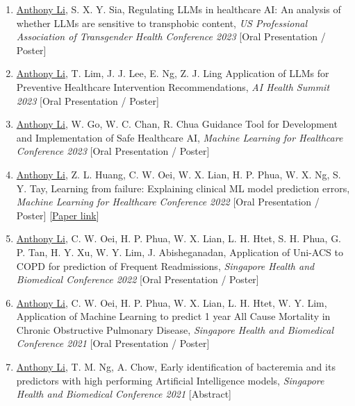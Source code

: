 \documentclass[letterpaper,10pt,oneside]{article}
\begin{document}
\begin{body}
\begin{enumerate}
\item \underline{Anthony Li}, S. X. Y. Sia, \textcolor{mygray}{Regulating LLMs in healthcare AI: An analysis of whether LLMs are sensitive to transphobic content}, \textit{US Professional Association of Transgender Health Conference 2023} [Oral Presentation / Poster]

\item \underline{Anthony Li}, T. Lim, J. J. Lee, E. Ng, Z. J. Ling \textcolor{mygray}{Application of LLMs for Preventive Healthcare Intervention Recommendations}, \textit{AI Health Summit 2023} [Oral Presentation / Poster]

\item \underline{Anthony Li}, W. Go, W. C. Chan, R. Chua \textcolor{mygray}{Guidance Tool for Development and Implementation of Safe Healthcare AI}, \textit{Machine Learning for Healthcare Conference 2023} [Oral Presentation / Poster]

\item \underline{Anthony Li}, Z. L. Huang, C. W. Oei, W. X. Lian, H. P. Phua, W. X. Ng, S. Y. Tay, \textcolor{mygray}{Learning from failure: Explaining clinical ML model prediction errors}, \textit{Machine Learning for Healthcare Conference 2022} [Oral Presentation / Poster]
[\href{https://static1.squarespace.com/static/59d5ac1780bd5ef9c396eda6/t/62e97c1b5754a426fa21d3bf/1659468827549/16+MLHC_Explaining_ML_model_failures_v4.pdf}{Paper link}]

\item \underline{Anthony Li}, C. W. Oei, H. P. Phua, W. X. Lian, L. H. Htet, S. H. Phua, G. P. Tan, H. Y. Xu, W. Y. Lim, J. Abisheganadan, \textcolor{mygray}{Application of Uni-ACS to COPD for prediction of Frequent Readmissions}, \textit{Singapore Health and Biomedical Conference 2022} [Oral Presentation / Poster]

\item \underline{Anthony Li}, C. W. Oei, H. P. Phua, W. X. Lian, L. H. Htet, W. Y. Lim, \textcolor{mygray}{Application of Machine Learning to predict 1 year All Cause Mortality in Chronic Obstructive Pulmonary Disease}, \textit{Singapore Health and Biomedical Conference 2021} [Oral Presentation / Poster]

\item \underline{Anthony Li}, T. M. Ng, A. Chow, \textcolor{mygray}{Early identification of bacteremia and its predictors with high performing Artificial Intelligence models}, \textit{Singapore Health and Biomedical Conference 2021} [Abstract]


\end{enumerate}
\end{body}
\end{document}
